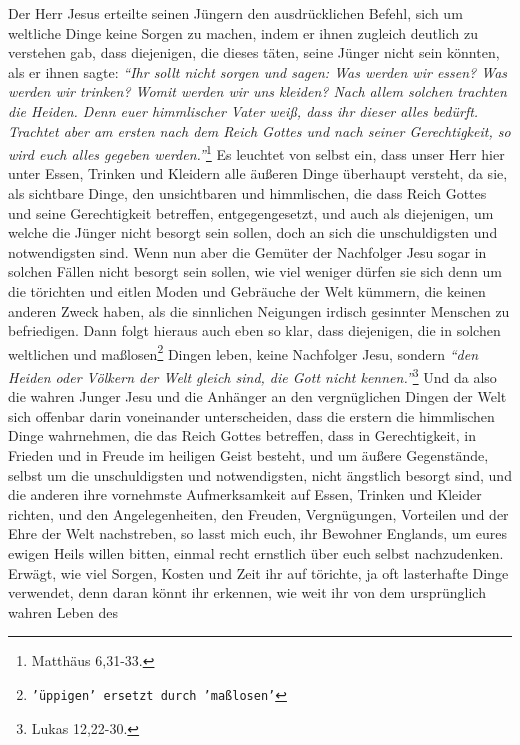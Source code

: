 Der Herr Jesus erteilte seinen Jüngern den ausdrücklichen Befehl, sich um
weltliche Dinge keine Sorgen zu machen, indem er ihnen zugleich deutlich zu
verstehen gab, dass diejenigen, die dieses täten, seine Jünger nicht sein
könnten, als er ihnen sagte:
\textit{"`Ihr sollt nicht sorgen und sagen: Was werden wir
essen? Was werden wir trinken? Womit werden wir uns kleiden? Nach allem solchen
trachten die Heiden. Denn euer himmlischer Vater weiß, dass ihr dieser alles
bedürft. Trachtet aber am ersten nach dem Reich Gottes und nach seiner
Gerechtigkeit, so wird euch alles gegeben werden."'}\footnote{Matthäus 6,31-33.}
Es leuchtet von selbst ein, dass unser Herr hier unter Essen,
Trinken und Kleidern alle äußeren Dinge überhaupt versteht, da sie, als
sichtbare Dinge, den unsichtbaren und himmlischen, die dass Reich
Gottes und
seine Gerechtigkeit betreffen, entgegengesetzt, und auch als diejenigen, um
welche die Jünger nicht besorgt sein sollen, doch an sich die unschuldigsten und
notwendigsten sind. Wenn nun aber die Gemüter der Nachfolger Jesu sogar in
solchen Fällen nicht besorgt sein sollen, wie viel weniger dürfen sie sich denn
um die törichten und eitlen Moden und Gebräuche der Welt kümmern, die keinen
anderen Zweck haben, als die sinnlichen Neigungen irdisch gesinnter Menschen zu
befriedigen. Dann folgt hieraus auch eben so klar, dass diejenigen, die in
solchen weltlichen und maßlosen\footnote{\texttt{'üppigen' ersetzt durch
'maßlosen'}}
Dingen leben, keine Nachfolger Jesu, sondern
\textit{"`den Heiden oder Völkern der Welt gleich sind, die Gott nicht
kennen."'}\footnote{Lukas 12,22-30.}
Und da also die wahren Junger Jesu und die
Anhänger an den vergnüglichen Dingen der Welt sich offenbar darin voneinander
unterscheiden, dass die erstern die himmlischen Dinge wahrnehmen, die das Reich
Gottes betreffen, dass in Gerechtigkeit, in Frieden und in Freude im heiligen
Geist besteht, und um äußere Gegenstände, selbst um die unschuldigsten und
notwendigsten, nicht ängstlich besorgt sind, und die anderen ihre vornehmste
Aufmerksamkeit auf Essen, Trinken und Kleider richten, und den Angelegenheiten,
den Freuden, Vergnügungen, Vorteilen und der Ehre der Welt nachstreben, so lasst
mich euch, ihr Bewohner Englands, um eures ewigen
Heils willen
bitten, einmal
recht ernstlich über euch selbst nachzudenken. Erwägt, wie viel Sorgen, Kosten
und Zeit ihr auf törichte, ja oft lasterhafte Dinge verwendet, denn daran
könnt ihr erkennen, wie weit ihr von dem ursprünglich wahren Leben des
